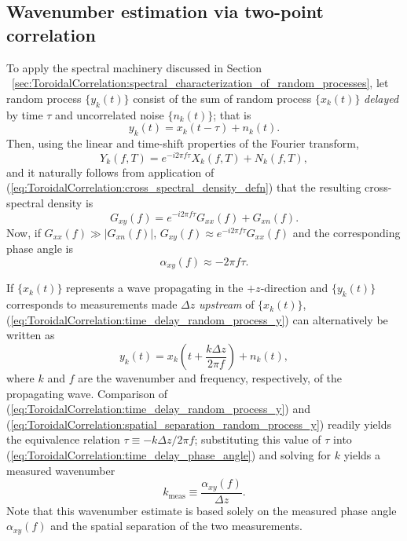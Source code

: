 \subsection{Wavenumber estimation via two-point correlation}
To apply the spectral machinery discussed in Section%
~\ref{sec:ToroidalCorrelation:spectral_characterization_of_random_processes},
let random process $\{y_k(t)\}$ consist of the sum of
random process $\{x_k(t)\}$ \emph{delayed} by time $\tau$ and
uncorrelated noise $\{n_k(t)\}$; that is
\begin{equation}
  y_k(t) = x_k(t - \tau) + n_k(t).
  \label{eq:ToroidalCorrelation:time_delay_random_process_y}
\end{equation}
Then, using the linear and time-shift properties of the Fourier transform,
\graffito{\textcolor{red}{Think about sign convention}}
\begin{equation}
  Y_k(f, T)
  =
  e^{-i 2 \pi f \tau} X_k(f, T)
  +
  N_k(f, T),
\end{equation}
and it naturally follows from application of
(\ref{eq:ToroidalCorrelation:cross_spectral_density_defn})
that the resulting cross-spectral density is
\begin{equation}
  G_{xy}(f) = e^{-i 2 \pi f \tau} G_{xx}(f) + G_{xn}(f).
  \label{eq:ToroidalCorrelation:time_delay_cross_spectral_density}
\end{equation}
Now, if $G_{xx}(f) \gg |G_{xn}(f)|$,
$G_{xy}(f) \approx e^{-i 2 \pi f \tau} G_{xx}(f)$ and
the corresponding phase angle is
\begin{equation}
  \alpha_{xy}(f) \approx -2 \pi f \tau.
  \label{eq:ToroidalCorrelation:time_delay_phase_angle}
\end{equation}

If $\{x_k(t)\}$ represents a wave propagating in the $+z$-direction
and $\{y_k(t)\}$ corresponds to measurements made
$\Delta z$ \emph{upstream} of $\{x_k(t)\}$,
(\ref{eq:ToroidalCorrelation:time_delay_random_process_y})
can alternatively be written as
\begin{equation}
  y_k(t) = x_k\left(t + \frac{k \Delta z}{2 \pi f}\right) + n_k(t),
  \label{eq:ToroidalCorrelation:spatial_separation_random_process_y}
\end{equation}
where $k$ and $f$ are the wavenumber and frequency, respectively,
of the propagating wave.
Comparison of (\ref{eq:ToroidalCorrelation:time_delay_random_process_y})
and (\ref{eq:ToroidalCorrelation:spatial_separation_random_process_y})
readily yields the equivalence relation $\tau \equiv -k \Delta z / 2 \pi f$;
substituting this value of $\tau$ into
(\ref{eq:ToroidalCorrelation:time_delay_phase_angle}) and
solving for $k$ yields a measured wavenumber
\begin{equation}
  k_{\text{meas}} \equiv \frac{\alpha_{xy}(f)}{\Delta z}.
  \label{eq:ToroidalCorrelation:measured_wavenumber}
\end{equation}
Note that this wavenumber estimate is based solely on
the measured phase angle $\alpha_{xy}(f)$ and
the spatial separation of the two measurements.


